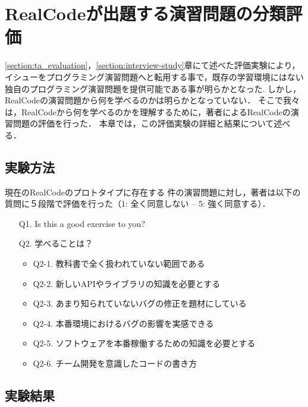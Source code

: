 
\chapter{RealCodeが出題する演習問題の分類評価}
\label{section:lab-study}


\ref{section:ta_evaluation}，\ref{section:interview-study}章にて述べた評価実験により，イシューをプログラミング演習問題へと転用する事で，既存の学習環境にはない独自のプログラミング演習問題を提供可能である事が明らかとなった.
しかし，RealCodeの演習問題から何を学べるのかは明らかとなっていない．
そこで我々は，RealCodeから何を学べるのかを理解するために，著者によるRealCodeの演習問題の評価を行った．
本章では，この評価実験の詳細と結果について述べる．


\section{実験方法}

現在のRealCodeのプロトタイプに存在する \xxx 件の演習問題に対し，著者は以下の質問に５段階で評価を行った（1: 全く同意しない -- 5: 強く同意する）．

\begin{itemize}
  \item[Q1.] Is this a good exercise to you?
  \item[Q2.] 学べることは？
  \begin{itemize}
  	  \item Q2-1. 教科書で全く扱われていない範囲である
   	  \item Q2-2. 新しいAPIやライブラリの知識を必要とする
      \item Q2-3. あまり知られていないバグの修正を題材にしている
      \item Q2-4. 本番環境におけるバグの影響を実感できる
      \item Q2-5. ソフトウェアを本番稼働するための知識を必要とする
      \item Q2-6. チーム開発を意識したコードの書き方
  \end{itemize}
\end{itemize}



\section{実験結果}








